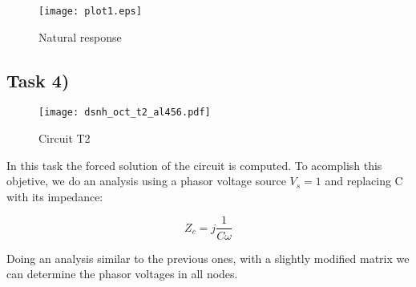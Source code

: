 \begin{figure}[H]
	\centering
	\texttt{[image: plot1.eps]}
	\caption{Natural response}
\label{fig:Dsnh_sim_t2}
\end{figure}


\subsection{Task 4)}
\label{subsec:task4_a}

\begin{figure}[H]
	\centering
	\texttt{[image: dsnh\_oct\_t2\_al456.pdf]}
	\caption{Circuit T2}
\label{fig:Dsnh_sim_t2}
\end{figure}
\newpage

In this task the forced solution of the circuit is computed. To acomplish this objetive, we do an analysis using a phasor voltage source $V_s=1$ and replacing C with its impedance:

\[
Z_c = j\frac{1}{C\omega}
\]

Doing an analysis similar to the previous ones, with a slightly modified matrix we can determine the phasor voltages in all nodes.

